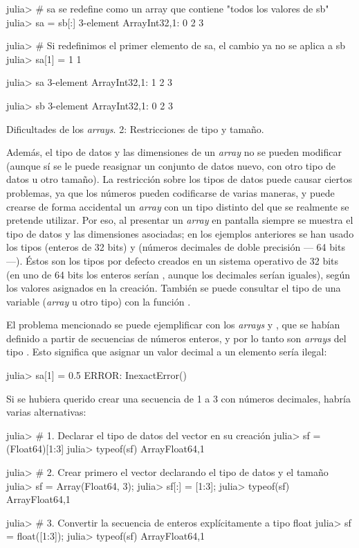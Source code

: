 ﻿\documentclass[spanish]{article}
\begin{document}
julia> # sa se redefine como un array que contiene "todos los valores de sb"
julia> sa = sb[:]
3-element Array{Int32,1}:
 0 2 3

julia> # Si redefinimos el primer elemento de sa, el cambio ya no se aplica a sb
julia> sa[1] = 1 1

julia> sa
3-element
Array{Int32,1}:
 1 2 3

julia> sb
3-element Array{Int32,1}:
 0 2 3

Dificultades de los \emph{arrays}. 2: Restricciones de tipo y tamaño.

Además, el tipo de datos y las dimensiones de un \emph{array} no se pueden modificar (aunque sí se le puede reasignar un conjunto de datos nuevo, con otro tipo de datos u otro tamaño). La restricción sobre los tipos de datos puede causar ciertos problemas, ya que los números pueden codificarse de varias maneras, y puede crearse de forma accidental un \emph{array} con un tipo distinto del que se realmente se pretende utilizar. Por eso, al presentar un \emph{array} en pantalla siempre se muestra el tipo de datos y las dimensiones asociadas; en los ejemplos anteriores se han usado los tipos  (enteros de 32 bits) y  (números decimales de doble precisión --- 64 bits ---). Éstos son los tipos por defecto creados en un sistema operativo de 32 bits (en uno de 64 bits los enteros serían , aunque los decimales serían iguales), según los valores asignados en la creación. También se puede consultar el tipo de una variable (\emph{array} u otro tipo) con la función .

El problema mencionado se puede ejemplificar con los \emph{arrays}  y , que se habían definido a partir de secuencias de números enteros, y por lo tanto son \emph{arrays} del tipo . Esto significa que asignar un valor decimal a un elemento sería ilegal:

julia> sa[1] = 0.5
ERROR: InexactError()

Si se hubiera querido crear una secuencia de 1 a 3 con números decimales, habría varias alternativas:

julia> # 1. Declarar el tipo de datos del vector en su creación
julia> sf = (Float64)[1:3]
julia> typeof(sf)
Array{Float64,1}

julia> # 2. Crear primero el vector declarando el tipo de datos y el tamaño
julia> sf = Array(Float64, 3);
julia> sf[:] = [1:3];
julia> typeof(sf)
Array{Float64,1}

julia> # 3. Convertir la secuencia de enteros explícitamente a tipo float
julia> sf = float([1:3]);
julia> typeof(sf)
Array{Float64,1}
\end{document}
